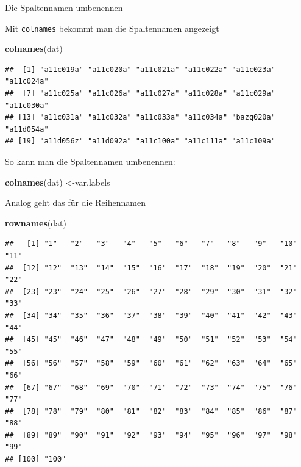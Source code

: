 \documentclass[ignorenonframetext,]{beamer}
\newenvironment{Shaded}{}{}
\newcommand{\KeywordTok}[1]{\textcolor[rgb]{0.00,0.44,0.13}{\textbf{{#1}}}}
\newcommand{\NormalTok}[1]{{#1}}
\begin{document}
\begin{frame}[fragile]{Die Spaltennamen umbenennen}

\begin{block}{Mit \texttt{colnames} bekommt man die Spaltennamen
angezeigt}

\begin{Shaded}
\begin{Highlighting}[]
\KeywordTok{colnames}\NormalTok{(dat)}
\end{Highlighting}
\end{Shaded}

\begin{verbatim}
##  [1] "a11c019a" "a11c020a" "a11c021a" "a11c022a" "a11c023a" "a11c024a"
##  [7] "a11c025a" "a11c026a" "a11c027a" "a11c028a" "a11c029a" "a11c030a"
## [13] "a11c031a" "a11c032a" "a11c033a" "a11c034a" "bazq020a" "a11d054a"
## [19] "a11d056z" "a11d092a" "a11c100a" "a11c111a" "a11c109a"
\end{verbatim}

\end{block}

\begin{block}{So kann man die Spaltennamen umbenennen:}

\begin{Shaded}
\begin{Highlighting}[]
\KeywordTok{colnames}\NormalTok{(dat) <-var.labels}
\end{Highlighting}
\end{Shaded}

\end{block}

\begin{block}{Analog geht das für die Reihennamen}

\begin{Shaded}
\begin{Highlighting}[]
\KeywordTok{rownames}\NormalTok{(dat)}
\end{Highlighting}
\end{Shaded}

\begin{verbatim}
##   [1] "1"   "2"   "3"   "4"   "5"   "6"   "7"   "8"   "9"   "10"  "11" 
##  [12] "12"  "13"  "14"  "15"  "16"  "17"  "18"  "19"  "20"  "21"  "22" 
##  [23] "23"  "24"  "25"  "26"  "27"  "28"  "29"  "30"  "31"  "32"  "33" 
##  [34] "34"  "35"  "36"  "37"  "38"  "39"  "40"  "41"  "42"  "43"  "44" 
##  [45] "45"  "46"  "47"  "48"  "49"  "50"  "51"  "52"  "53"  "54"  "55" 
##  [56] "56"  "57"  "58"  "59"  "60"  "61"  "62"  "63"  "64"  "65"  "66" 
##  [67] "67"  "68"  "69"  "70"  "71"  "72"  "73"  "74"  "75"  "76"  "77" 
##  [78] "78"  "79"  "80"  "81"  "82"  "83"  "84"  "85"  "86"  "87"  "88" 
##  [89] "89"  "90"  "91"  "92"  "93"  "94"  "95"  "96"  "97"  "98"  "99" 
## [100] "100"
\end{verbatim}

\end{block}

\end{frame}
\end{document}
